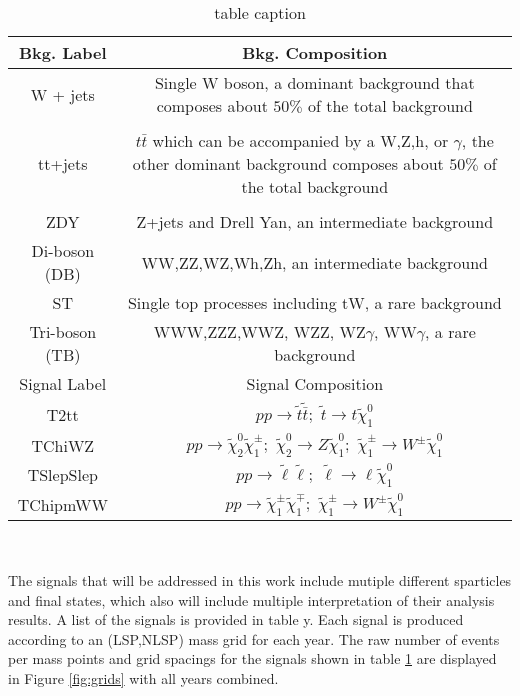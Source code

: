 \begin{table}
\label{tab:bkgsigtab}
\caption{table caption}
\begin{tabular}{c|c}
\hline 
Bkg. Label & Bkg. Composition \\ 
\hline 
\hline

W + jets & \makecell{Single W boson, a dominant background that composes \\ about $50\%$ of the total background} \\ 
  & \\
tt+jets & \makecell{$t\bar{t}$ which can be accompanied by a W,Z,h, or $\gamma$, \\ the other dominant background composes about $50\%$ of the total background} \\ 
  & \\
ZDY & Z+jets and Drell Yan, an intermediate background \\ 
Di-boson (DB)& WW,ZZ,WZ,Wh,Zh,  an intermediate background \\ 

ST & Single top processes including tW, a rare background \\ 

Tri-boson (TB) & WWW,ZZZ,WWZ, WZZ, WZ$\gamma$, WW$\gamma$, a rare background  \\ 
\hline 
Signal Label & Signal Composition \\
\hline
\hline
T2tt & $pp \rightarrow \tilde{t} \tilde{\bar{t}}; \, \, \tilde{t}\rightarrow t \tilde{\chi}_1^0$ \\
TChiWZ & $pp\rightarrow \tilde{\chi}_2^0 \tilde{\chi}_1^\pm; \, \, \tilde{\chi}_2^0 \rightarrow Z \tilde{\chi}^0_1; \, \, \tilde{\chi}_1^\pm \rightarrow W^\pm \tilde{\chi}^0_1$ \\
TSlepSlep & $pp\rightarrow \tilde{\ell} \tilde{\ell}; \, \, \tilde{\ell} \rightarrow \ell \tilde{\chi}^0_1$ \\
TChipmWW & $pp\rightarrow \tilde{\chi}_1^\pm \tilde{\chi}_1^\mp; \, \,  \tilde{\chi}_1^\pm \rightarrow W^\pm \tilde{\chi}^0_1$  \\
\end{tabular} \\
\end{table}

The signals that will be addressed in this work include mutiple different sparticles and final states, which also will include multiple interpretation of their analysis results. A list of the signals is provided in table y. Each signal is produced according to an (LSP,NLSP) mass grid for each year.  The raw number of events per mass points and grid spacings for the signals shown in table \ref{tab:bkgsigtab} are displayed in Figure \ref{fig:grids} with all years combined. 

